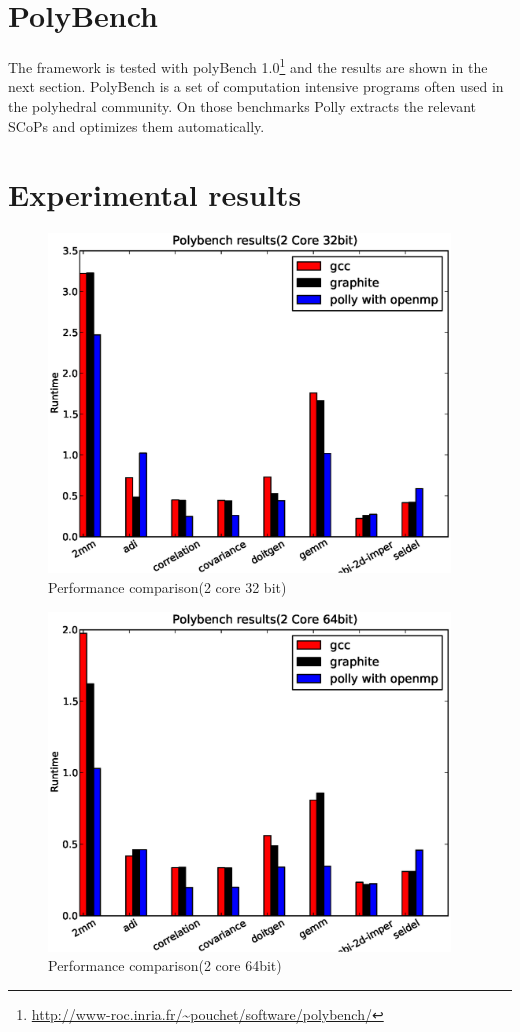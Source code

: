 \label{chap:testing}
\section{PolyBench}
The framework is tested with polyBench 1.0\footnote{\url{http://www-roc.inria.fr/~pouchet/software/polybench/}} and the results are shown in the next section.
PolyBench is a set of computation intensive programs often used in the polyhedral community.
On those benchmarks Polly extracts the relevant SCoPs and optimizes them automatically.

\section{Experimental results}
\begin{figure}
\begin{center}
  \includegraphics[height=9cm]{images/2core32bit.eps}
  \caption{Performance comparison(2 core 32 bit)}
  \label{fig:2core1}
\end{center}
\end{figure}

\begin{figure}
\begin{center}
  \includegraphics[height=9cm]{images/2core64bit.eps}
  \caption{Performance comparison(2 core 64bit)}
  \label{fig:2core2}
\end{center}
\end{figure}

